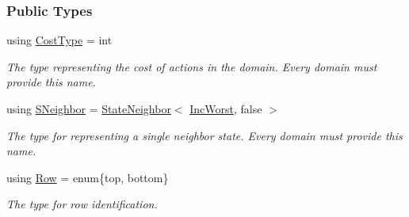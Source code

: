 \subsubsection*{Public Types}
\begin{DoxyCompactItemize}
\item 
using \hyperlink{structincWorst_1_1IncWorst_ad7fd4fc9dbb500cbc86a9e574ba5aba1}{Cost\+Type} = int\hypertarget{structincWorst_1_1IncWorst_ad7fd4fc9dbb500cbc86a9e574ba5aba1}{}\label{structincWorst_1_1IncWorst_ad7fd4fc9dbb500cbc86a9e574ba5aba1}

\begin{DoxyCompactList}\small\item\em The type representing the cost of actions in the domain. Every domain must provide this name. \end{DoxyCompactList}\item 
using \hyperlink{structincWorst_1_1IncWorst_ad762108f9045255b905bf3495af469d6}{S\+Neighbor} = \hyperlink{structStateNeighbor}{State\+Neighbor}$<$ \hyperlink{structincWorst_1_1IncWorst}{Inc\+Worst}, false $>$\hypertarget{structincWorst_1_1IncWorst_ad762108f9045255b905bf3495af469d6}{}\label{structincWorst_1_1IncWorst_ad762108f9045255b905bf3495af469d6}

\begin{DoxyCompactList}\small\item\em The type for representing a single neighbor state. Every domain must provide this name. \end{DoxyCompactList}\item 
using \hyperlink{structincWorst_1_1IncWorst_abd5c58aa826b8edef33ff888c7d7e664}{Row} = enum\{top, bottom\}\hypertarget{structincWorst_1_1IncWorst_abd5c58aa826b8edef33ff888c7d7e664}{}\label{structincWorst_1_1IncWorst_abd5c58aa826b8edef33ff888c7d7e664}

\begin{DoxyCompactList}\small\item\em The type for row identification. \end{DoxyCompactList}\end{DoxyCompactItemize}
